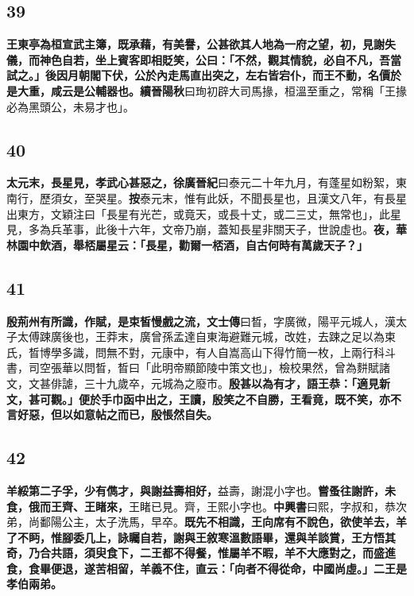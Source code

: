 \subsection*{39}

\textbf{王東亭為桓宣武主簿，既承藉，有美譽，公甚欲其人地為一府之望，初，見謝失儀，而神色自若，坐上賓客即相貶笑，公曰：「不然，觀其情貌，必自不凡，吾當試之。」後因月朝閣下伏，公於內走馬直出突之，左右皆宕仆，而王不動，名價於是大重，咸云是公輔器也。}{\footnotesize \textbf{續晉陽秋}曰珣初辟大司馬掾，桓溫至重之，常稱「王掾必為黑頭公，未易才也」。}

\subsection*{40}

\textbf{太元末，長星見，孝武心甚惡之，}{\footnotesize \textbf{徐廣晉紀}曰泰元二十年九月，有蓬星如粉絮，東南行，歷須女，至哭星。\textbf{按}泰元末，惟有此妖，不聞長星也，且漢文八年，有長星出東方，文穎注曰「長星有光芒，或竟天，或長十丈，或二三丈，無常也」，此星見，多為兵革事，此後十六年，文帝乃崩，蓋知長星非關天子，世說虛也。}\textbf{夜，華林園中飲酒，舉桮屬星云：「長星，勸爾一桮酒，自古何時有萬歲天子？」}

\subsection*{41}

\textbf{殷荊州有所識，作賦，是束皙慢戲之流，}{\footnotesize \textbf{文士傳}曰晳，字廣微，陽平元城人，漢太子太傅踈廣後也，王莽末，廣曾孫孟達自東海避難元城，改姓，去踈之足以為束氏，晳博學多識，問無不對，元康中，有人自嵩高山下得竹簡一枚，上兩行科斗書，司空張華以問晳，晳曰「此明帝顯節陵中策文也」，檢校果然，曾為䴵賦諸文，文甚俳謔，三十九歲卒，元城為之廢市。}\textbf{殷甚以為有才，語王恭：「適見新文，甚可觀。」便於手巾函中出之，王讀，殷笑之不自勝，王看竟，既不笑，亦不言好惡，但以如意帖之而已，殷悵然自失。}

\subsection*{42}

\textbf{羊綏第二子孚，少有儁才，與謝益壽相好，}{\footnotesize 益壽，謝混小字也。}\textbf{嘗蚤往謝許，未食，俄而王齊、王睹來，}{\footnotesize 王睹已見。齊，王熙小字也。\textbf{中興書}曰熙，字叔和，恭次弟，尚鄱陽公主，太子洗馬，早卒。}\textbf{既先不相識，王向席有不說色，欲使羊去，羊了不眄，惟腳委几上，詠矚自若，謝與王敘寒溫數語畢，還與羊談賞，王方悟其奇，乃合共語，須臾食下，二王都不得餐，惟屬羊不暇，羊不大應對之，而盛進食，食畢便退，遂苦相留，羊義不住，直云：「向者不得從命，中國尚虛。」二王是孝伯兩弟。}